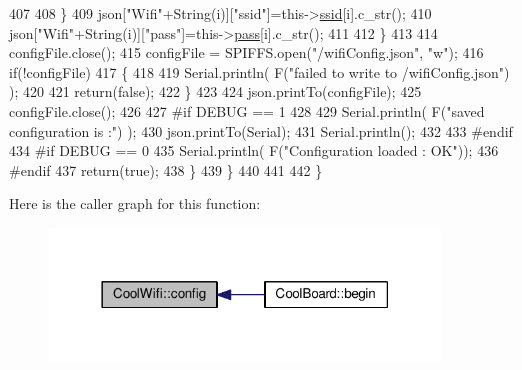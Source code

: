 \begin{DoxyCode}
407                     
408                 \}
409                 json[\textcolor{stringliteral}{"Wifi"}+String(i)][\textcolor{stringliteral}{"ssid"}]=this->\hyperlink{class_cool_wifi_a893b21d0fed821438733bba2e73fb4c2}{ssid}[i].c\_str();
410                 json[\textcolor{stringliteral}{"Wifi"}+String(i)][\textcolor{stringliteral}{"pass"}]=this->\hyperlink{class_cool_wifi_a0c3332a149245aaad060b32593a54c9b}{pass}[i].c\_str();           
411                         
412             \}
413 
414             configFile.close();
415             configFile = SPIFFS.open(\textcolor{stringliteral}{"/wifiConfig.json"}, \textcolor{stringliteral}{"w"});
416             \textcolor{keywordflow}{if}(!configFile)
417             \{
418             
419                 Serial.println( F(\textcolor{stringliteral}{"failed to write to /wifiConfig.json"}) );
420             
421                 \textcolor{keywordflow}{return}(\textcolor{keyword}{false});              
422             \}
423             
424             json.printTo(configFile);
425             configFile.close();
426 
427 \textcolor{preprocessor}{        #if DEBUG == 1 }
428 
429             Serial.println( F(\textcolor{stringliteral}{"saved configuration is :"}) );
430             json.printTo(Serial);
431             Serial.println();
432         
433 \textcolor{preprocessor}{        #endif}
434 \textcolor{preprocessor}{        #if DEBUG == 0}
435             Serial.println( F(\textcolor{stringliteral}{"Configuration loaded : OK"}));
436 \textcolor{preprocessor}{        #endif}
437             \textcolor{keywordflow}{return}(\textcolor{keyword}{true}); 
438         \}
439     \}   
440     
441 
442 \}
\end{DoxyCode}
Here is the caller graph for this function\+:\nopagebreak
\begin{figure}[H]
\begin{center}
\leavevmode
\includegraphics[width=294pt]{d7/d29/class_cool_wifi_a4eb2f6b9b09dd588964b88b6c70122c0_icgraph}
\end{center}
\end{figure}
\mbox{\label{class_cool_wifi_a2a9a546f76816c8c5c8e2d46a6c4f07d}} 
